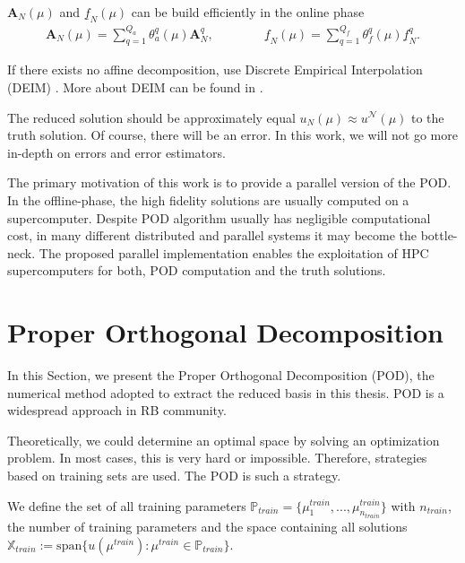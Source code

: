 $  \mathbf{A}_N (\mu) $ and $ \underline{f}_N (\mu) $ can be build efficiently in the online phase
\begin{align*}
\mathbf{A}_N (\mu) = \sum_{q=1}^{Q_a} \theta_a^q(\mu) \mathbf{A}_N^q,
\qquad \qquad 
\underline{f}_N (\mu) = \sum_{q=1}^{Q_f} \theta_f^q(\mu) \underline{f}_N^q.
\end{align*}


If there exists no affine decomposition, use Discrete Empirical Interpolation (DEIM) \cite[Chapter 5]{HRSbook}. More about DEIM can be found in \cite{DEIM}.





The reduced solution should be approximately equal $u_N(\mu) \approx  u^\mathcal{N}(\mu)$ to the truth solution. Of course, there will be an error.
In this work, we will not go more in-depth on errors and error estimators.

The primary motivation of this work is to provide a parallel version of the POD.
In the offline-phase, the high fidelity solutions are usually computed on a supercomputer. 
Despite POD algorithm usually has negligible computational cost, in many different distributed and parallel systems it may become the bottle-neck.
The proposed parallel implementation enables the exploitation of HPC supercomputers for both, POD computation and the truth solutions.


\newpage
\section{Proper Orthogonal Decomposition}
\label{sec:POD}

In this Section, we present the Proper Orthogonal Decomposition (POD), the numerical method adopted to extract the reduced basis in this thesis.
POD is a widespread approach in RB community.

Theoretically, we could determine an optimal space by solving an optimization problem. 
In most cases, this is very hard or impossible.
Therefore, strategies based on training sets are used.
The POD is such a strategy.

We define the set of all training parameters $ \mathbb{P}_{train} = \{\mu_1^{train}, ..., \mu_{n_{train}}^{train}\} $ with $n_{train}$, the number of training parameters and  the space containing all solutions $ \mathbb{X}_{train} := \text{span} \{u(\mu^{train}): \mu^{train} \in \mathbb{P}_{train}\} $.

